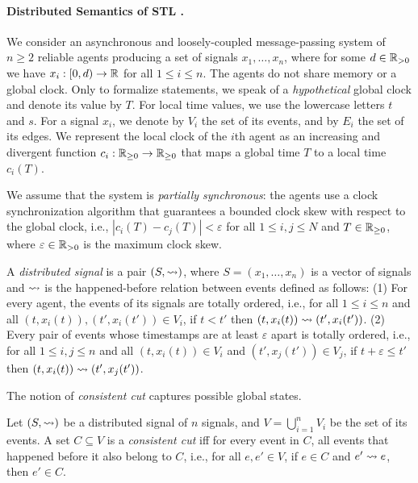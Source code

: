 \paragraph*{Distributed Semantics of STL \cite{MomtazAB23}.}
We consider an asynchronous and loosely-coupled message-passing system of $n \geq 2$ reliable agents producing a set of signals $x_1, \ldots, x_n$, where for some $d \in \mathbb{R}_{> 0}$ we have $x_i : [0,d) \to \mathbb{R}$ for all $1 \leq i \leq n$.
%
The agents do not share memory or a global clock.
%
Only to formalize statements, we speak of a \emph{hypothetical} global clock and denote its value by $T$.
%
For local time values, we use the lowercase letters $t$ and $s$.
For a signal $x_i$, we denote by $V_i$ the set of its events, and by $E_i$ the set of its edges.
%
We represent the local clock of the $i$th agent as an increasing and divergent function $c_i : 
\mathbb{R}_{\geq 0} \to \mathbb{R}_{\geq 0}$ that maps a global time $T$ to a local time $c_i(T)$.

We assume that the system is \emph{partially synchronous}: the agents use a clock synchronization algorithm that guarantees a bounded clock skew with respect to the global clock, i.e., $|c_i(T) - c_j(T)| < \varepsilon$ for all $1 \leq i,j \leq N$ and $T \in \mathbb{R}_{\geq 0}$, where $\varepsilon \in \mathbb{R}_{> 0}$ is the maximum clock skew.

\begin{definition} \label{defn:hb}
	A \emph{distributed signal} is a pair $(S, {\rightsquigarrow})$, where $S = (x_1, \ldots, x_n)$ is a vector of 
	signals and ${\rightsquigarrow}$ is the happened-before relation between events defined as follows:
	(1) For every agent, the events of its signals are totally ordered, i.e., for all $1 \leq i \leq n$ and all $(t, x_i(t)), (t', x_i(t')) \in V_i$, if $t < t'$ then $(t, x_i(t)) \rightsquigarrow (t', x_i(t'))$.
	(2) Every pair of events whose timestamps are at least $\varepsilon$ apart is totally ordered, i.e., for all $1 \leq i,j \leq n$ and all $(t, x_i(t)) \in V_i$ and $(t', x_j(t')) \in V_j$, if $t + \varepsilon \leq t'$ then $(t, x_i(t)) \rightsquigarrow (t', x_j(t'))$.
\end{definition}

The notion of \emph{consistent cut} captures possible global states.

\begin{definition}
	Let $(S, {\rightsquigarrow})$ be a distributed signal of $n$ signals, and $V = \bigcup_{i = 1}^{n} V_i$ be the set of its events.
	A set $C \subseteq V$ is a \emph{consistent cut} iff for every event in $C$, all events that happened before  it also belong to $C$, i.e., for all $e, e' \in V$, if $e \in C$ and $e' \rightsquigarrow e$, then $e' \in C$.
\end{definition}

